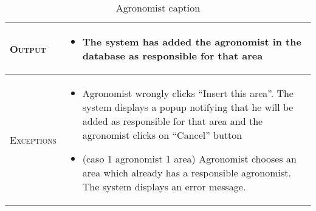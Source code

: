 \begin{table}[H]
\begin{tabular}[c]{|l|p{}|}
    	\hline %
    	\textsc{Output}             &  \begin{itemize}
    	    \item The system has added the agronomist in the database as responsible for that area
    	\end{itemize}\\
    	\hline %
    	\textsc{Exceptions}         &  \begin{itemize}
    	    \item Agronomist wrongly clicks “Insert this area”. The system displays a popup notifying that he will be added as responsible for that area and the agronomist clicks on “Cancel” button
    	    \item (caso 1 agronomist 1 area) Agronomist chooses an area which already has a responsible agronomist. The system displays an error message.
    	\end{itemize}\\
    	\hline %
        
    \end{tabular}
    \caption{\label{tab:responsible_area_insertion}Agronomist caption }
\end{table}


